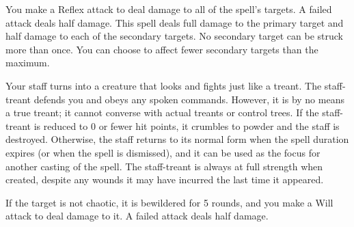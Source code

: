 \spellrng{\rngmed}
\begin{spelleffect}
    You make a Reflex attack to deal damage to all of the spell's targets. A failed attack deals half damage. This spell deals full damage to the primary target and half damage to each of the secondary targets. No secondary target can be struck more than once. You can choose to affect fewer secondary targets than the maximum.
\end{spelleffect}

\spellrng{\rngtouch}
\begin{spelleffect}
  Your staff turns into a creature that looks and fights just like a treant. The staff-treant defends you and obeys any spoken commands. However, it is by no means a true treant; it cannot converse with actual treants or control trees. If the staff-treant is reduced to 0 or fewer hit points, it crumbles to powder and the staff is destroyed. Otherwise, the staff returns to its normal form when the spell duration expires (or when the spell is dismissed), and it can be used as the focus for another casting of the spell. The staff-treant is always at full strength when created, despite any wounds it may have incurred the last time it appeared.
\end{spelleffect}

\spellrng{\rngmed}
\begin{spelleffect}
    If the target is not chaotic, it is bewildered for 5 rounds, and you make a Will attack to deal damage to it. A failed attack deals half damage.
\end{spelleffect}

